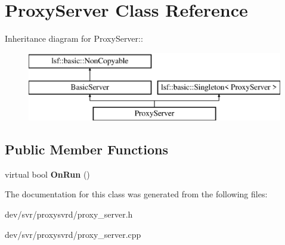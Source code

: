 \hypertarget{classProxyServer}{
\section{ProxyServer Class Reference}
\label{classProxyServer}
}
Inheritance diagram for ProxyServer::\begin{figure}[H]
\begin{center}
\leavevmode
\includegraphics[height=3cm]{classProxyServer}
\end{center}
\end{figure}
\subsection*{Public Member Functions}
\begin{DoxyCompactItemize}
\item 
\hypertarget{classProxyServer_aa18b615dc62b4f40694df0e75fb843c9}{
virtual bool {\bfseries OnRun} ()}
\label{classProxyServer_aa18b615dc62b4f40694df0e75fb843c9}

\end{DoxyCompactItemize}


The documentation for this class was generated from the following files:\begin{DoxyCompactItemize}
\item 
dev/svr/proxysvrd/proxy\_\-server.h\item 
dev/svr/proxysvrd/proxy\_\-server.cpp\end{DoxyCompactItemize}

